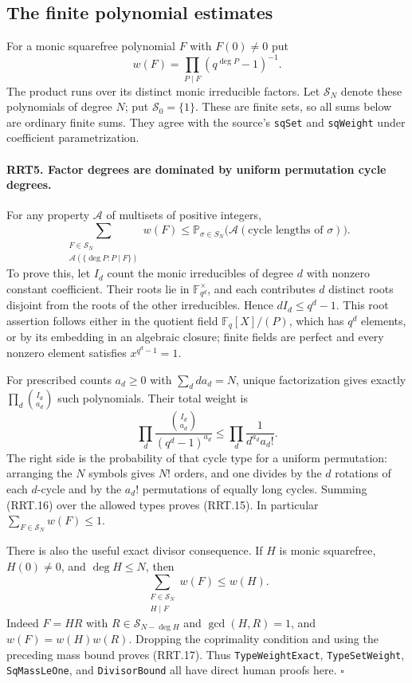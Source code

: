\subsection{The finite polynomial estimates}

For a monic squarefree polynomial $F$ with $F(0)\ne0$ put
\[
           w(F)=\prod_{P\mid F}(q^{\deg P}-1)^{-1}.
 \tag{RRT.14}
\]
The product runs over its distinct monic irreducible factors.
Let $\mathcal S_N$ denote these polynomials of degree $N$; put
$\mathcal S_0=\{1\}$.  These are finite sets, so all sums below
are ordinary finite sums.  They agree with the source's
\texttt{sqSet} and \texttt{sqWeight} under coefficient
parametrization.

\paragraph{RRT5. Factor degrees are dominated by uniform permutation cycle degrees.}
\label{claim:RRT5}
For any property $\mathcal A$ of multisets of positive integers,
\[
 \sum_{\substack{F\in\mathcal S_N\\
               \mathcal A(\{\deg P:P\mid F\})}}w(F)
 \le\mathbb P_{\sigma\in S_N}
              \bigl(\mathcal A(\text{cycle lengths of }\sigma)\bigr).
 \tag{RRT.15}
\]
To prove this, let $I_d$ count the monic irreducibles of degree
$d$ with nonzero constant coefficient.  Their roots lie in
$\mathbb F_{q^d}^\times$, and each contributes $d$ distinct roots
disjoint from the roots of the other irreducibles.  Hence
$dI_d\le q^d-1$.  This root assertion follows either in the
quotient field $\mathbb F_q[X]/(P)$, which has $q^d$ elements,
or by its embedding in an algebraic closure; finite fields are
perfect and every nonzero element satisfies $x^{q^d-1}=1$.

For prescribed counts $a_d\ge0$ with $\sum_d da_d=N$, unique
factorization gives exactly $\prod_d\binom{I_d}{a_d}$ such
polynomials.  Their total weight is
\[
 \prod_d\frac{\binom{I_d}{a_d}}{(q^d-1)^{a_d}}
       \le\prod_d\frac1{d^{a_d}a_d!}.
 \tag{RRT.16}
\]
The right side is the probability of that cycle type for a
uniform permutation: arranging the $N$ symbols gives $N!$
orders, and one divides by the $d$ rotations of each $d$-cycle
and by the $a_d!$ permutations of equally long cycles.
Summing (RRT.16) over the allowed types proves (RRT.15).
In particular $\sum_{F\in\mathcal S_N}w(F)\le1$.

There is also the useful exact divisor consequence.  If $H$ is
monic squarefree, $H(0)\ne0$, and $\deg H\le N$, then
\[
                 \sum_{\substack{F\in\mathcal S_N\\H\mid F}}w(F)
                         \le w(H).
 \tag{RRT.17}
\]
Indeed $F=HR$ with $R\in\mathcal S_{N-\deg H}$ and
$\gcd(H,R)=1$, and $w(F)=w(H)w(R)$.  Dropping the coprimality
condition and using the preceding mass bound proves (RRT.17).
Thus \texttt{TypeWeightExact}, \texttt{TypeSetWeight},
\texttt{SqMassLeOne}, and \texttt{DivisorBound} all have direct
human proofs here.
\hfill$\square$

